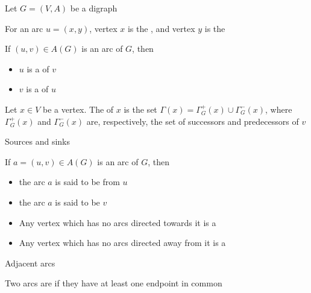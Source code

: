 \documentclass[aspectratio=169]{beamer}\usepackage[]{graphicx}\usepackage[]{xcolor}
\begin{document}
\begin{frame}
	Let $G=(V,A)$ be a digraph
	\begin{definition}
	For an arc $u=(x,y)$, vertex $x$ is the , and vertex $y$ is the 
	\end{definition}
	\begin{definition}
		If $(u,v)\in A(G)$ is an arc of $G$, then
		\begin{itemize}
			\item  $u$ is a  of $v$
			\item  $v$ is a  of $u$
		\end{itemize}
	\end{definition}
	\begin{definition}
	Let $x\in V$ be a vertex. The  of $x$ is the set $\Gamma(x) = \Gamma^+_G(x)\cup\Gamma^-_G(x)$, where $\Gamma^+_G(x)$ and $\Gamma^-_G(x)$ are, respectively, the set of successors and predecessors of $v$
	\end{definition}
\end{frame}
	
	
\begin{frame}{Sources and sinks}
	\begin{definition}
		If $a=(u,v)\in A(G)$ is an arc of $G$, then
		\begin{itemize}
			\item the arc $a$ is said to be  from $u$
			\item the arc $a$ is said to be  $v$
		\end{itemize}
	\end{definition}
	\vfill
	\begin{definition}
		\begin{itemize}
			\item Any vertex which has no arcs directed towards it is a 
			\item Any vertex which has no arcs directed away from it is a 
		\end{itemize}
	\end{definition}
\end{frame}

\begin{frame}{Adjacent arcs}
	\begin{definition}
		Two arcs are  if they have at least one endpoint in common
	\end{definition}
\end{frame}
\end{document}
